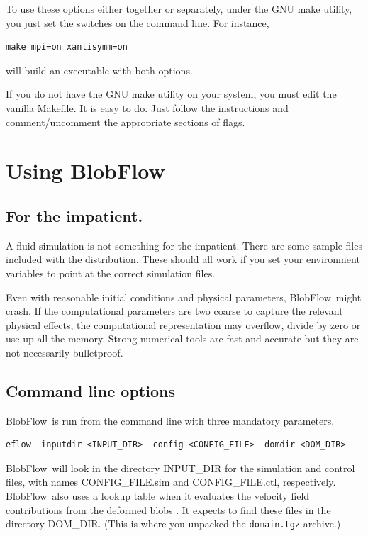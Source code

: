 \documentclass[12pt]{report}
\newcommand{\BF}{BlobFlow}
\begin{document}
To use these options either together or separately, under the GNU make
utility, you just set the switches on the command line. For instance,
\begin{verbatim}
make mpi=on xantisymm=on
\end{verbatim}
will build an executable with both options.

If you do not have the GNU make utility on your system, you must edit the
vanilla Makefile.  It is easy to do.  Just follow the instructions and
comment/uncomment the appropriate sections of flags.

\chapter{Using \BF}

\section{For the impatient.}

A fluid simulation is not something for the impatient.  There are some
sample files included with the distribution.  These should all work if you
set your environment variables to point at the correct simulation files.

Even with reasonable initial conditions and physical
parameters,
\BF~might crash.  If the computational parameters
are two coarse to capture the relevant physical effects, the computational
representation may overflow, divide by zero or use up all the memory.
Strong numerical tools are fast and accurate but they are not necessarily 
bulletproof.

\section{Command line options}

\BF~is run from the command line with three mandatory parameters.
\begin{verbatim}
eflow -inputdir <INPUT_DIR> -config <CONFIG_FILE> -domdir <DOM_DIR>
\end{verbatim}
\BF~will look in the directory INPUT\_DIR for the simulation and control files,
with names CONFIG\_FILE.sim and CONFIG\_FILE.ctl, respectively.  \BF~also uses a
lookup table when it evaluates the velocity field contributions from the
deformed blobs \cite{platte-rossi-mitchell}.  It expects to find these files in
the directory DOM\_DIR.  (This is where you unpacked the \texttt{domain.tgz}
archive.)
\end{document}
